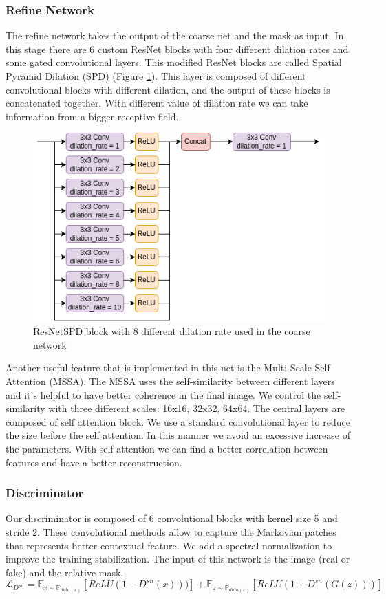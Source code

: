 \documentclass[10pt,twocolumn,letterpaper]{article}
\begin{document}
\subsubsection{Refine Network}
The refine network takes the output of the coarse net and the mask as input.
In this stage there are 6 custom ResNet blocks with four different dilation rates and some
gated convolutional layers.
This modified ResNet blocks are called Spatial Pyramid Dilation (SPD) (Figure
\ref{fig:rnspd}). This layer is composed of different convolutional blocks with
different dilation, and the output of these blocks is concatenated together.
With different value of dilation rate we can take information from a bigger
receptive field.
\begin{figure}
  \includegraphics[width=1\linewidth]{img/SPDresnet.png}
  \caption{ResNetSPD block with 8 different dilation rate used in the coarse
  network}
  \label{fig:rnspd}
\end{figure}
Another useful feature that is implemented in this net is the Multi Scale Self
Attention (MSSA). The MSSA uses the self-similarity between different layers
and it's helpful to have better coherence in the final image. We control
the self-similarity with three different scales: 16x16, 32x32, 64x64.
The central layers are composed of self attention block. We use a standard
convolutional layer to reduce the size before the self attention. In this manner
we avoid an excessive increase of the parameters. With self attention we can
find a better correlation between features and have a better reconstruction.
\subsubsection{Discriminator}
Our discriminator is composed of 6 convolutional blocks with kernel size 5 and
stride 2.
These convolutional methods allow to capture the Markovian patches that
represents better contextual feature\cite{li2016precomputed}.
We add a spectral normalization to improve the training
stabilization\cite{miyato2018spectral}.
The input of this network is the image (real or fake) and the relative mask.
\begin{dmath}
        \mathcal{L}_{D^{sn}}= \mathbb{E}_{x\sim \mathbb{P}_{data(x)}} \left [
          ReLU(1-D^{sn}(x))) \right ] + \mathbb{E}_{z\sim \mathbb{P}_{data(x)}}
        \left [ ReLU(1+D^{sn}(G(z)))\right ]
\end{dmath}
\end{document}
